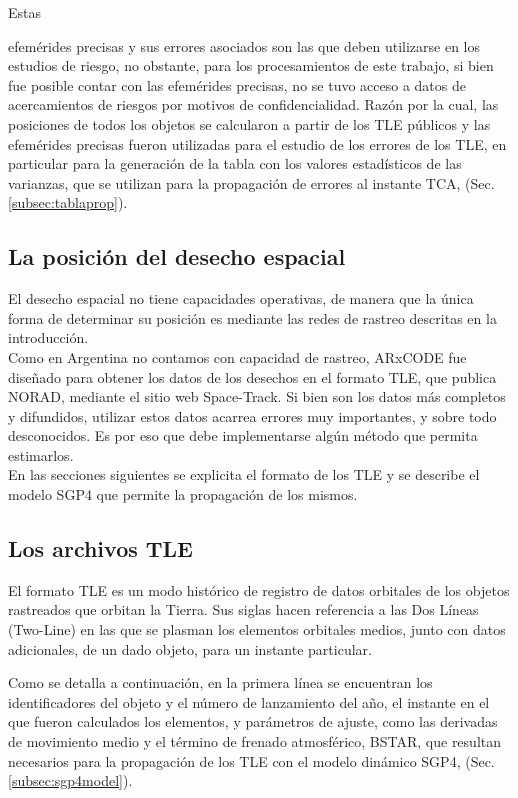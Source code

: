 Estas {efem\'erides precisas y sus errores asociados son las que deben utilizarse en los estudios de riesgo, no obstante, para los procesamientos de este trabajo, si bien fue posible contar con las efem\'erides precisas, no se tuvo acceso a datos de acercamientos de riesgos por motivos de confidencialidad. Raz\'on por la cual, las posiciones de todos los objetos se calcularon a partir de los TLE p\'ublicos y las efem\'erides precisas fueron utilizadas para el estudio de los errores de los TLE, en particular para la generaci\'on de la tabla con los valores estad\'isticos de las varianzas, que se utilizan para la propagaci\'on de errores al instante TCA, (Sec. \ref{subsec:tablaprop}). \\

\subsection{La posici\'on del desecho espacial}
El desecho espacial no tiene capacidades operativas, de manera que la \'unica forma de determinar su posici\'on es mediante las redes de rastreo descritas en la introducci\'on.\\

Como en Argentina no contamos con capacidad de rastreo, ARxCODE fue dise\~nado para obtener los datos de los desechos en el formato TLE, que publica NORAD, mediante el sitio web Space-Track.
Si bien son los datos m\'as completos y difundidos, utilizar estos datos acarrea errores muy importantes, y sobre todo desconocidos. Es por eso que debe implementarse alg\'un m\'etodo que permita estimarlos.\\

En las secciones siguientes se explicita el formato de los TLE y se describe el modelo SGP4 que permite la propagaci\'on de los mismos.\\

\subsection{Los archivos TLE}\label{subsec:tleformat}

El formato TLE es un modo hist\'orico de registro de datos orbitales de los objetos rastreados que orbitan la Tierra. Sus siglas  hacen referencia a las Dos L\'ineas (Two-Line) en las que se plasman los elementos orbitales medios, junto con datos adicionales, de un dado objeto, para un instante particular.

Como se detalla a continuación, en la primera l\'inea se encuentran los identificadores del objeto y el n\'umero de lanzamiento del año, el instante en el que fueron calculados los elementos, y parámetros de ajuste, como las derivadas de movimiento medio y el t\'ermino de frenado atmosf\'erico, BSTAR, que resultan necesarios para la propagación de los TLE con el modelo dinámico SGP4, (Sec. \ref{subsec:sgp4model}).

}
